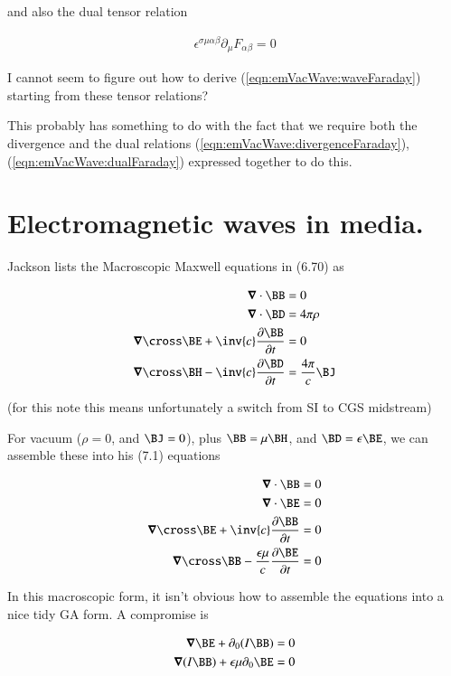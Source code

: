 and also the dual tensor relation

\begin{align}\label{eqn:emVacWave:dualFaraday}
\epsilon^{\sigma\mu\alpha\beta} \partial_\mu F_{\alpha\beta} = 0
\end{align}

I cannot seem to figure out how to derive (\ref{eqn:emVacWave:waveFaraday}) starting from these tensor relations?

This probably has something to do with the fact that we require both the divergence and the dual relations (\ref{eqn:emVacWave:divergenceFaraday}), (\ref{eqn:emVacWave:dualFaraday}) expressed together to do this.

\section{Electromagnetic waves in media.}

Jackson lists the Macroscopic Maxwell equations in (6.70) as 

\begin{align*}
\spacegrad \cdot \BB &= 0 \\
\spacegrad \cdot \BD &= 4 \pi \rho \\
\spacegrad \cross \BE + \inv{c}\PD{t}{\BB} &= 0 \\
\spacegrad \cross \BH - \inv{c}\PD{t}{\BD} &= \frac{4 \pi}{c} \BJ  \\
\end{align*}

(for this note this means unfortunately a switch from SI to CGS midstream)

For vacuum ($\rho =0$, and $\BJ =0$), plus $\BB = \mu \BH$, and $\BD = \epsilon \BE$, we can assemble these into his (7.1) equations

\begin{align*}
\spacegrad \cdot \BB &= 0 \\
\spacegrad \cdot \BE &= 0 \\
\spacegrad \cross \BE + \inv{c}\PD{t}{\BB} &= 0 \\
\spacegrad \cross \BB - \frac{\epsilon \mu}{c}\PD{t}{\BE} &= 0  \\
\end{align*}

In this macroscopic form, it isn't obvious how to assemble the equations into a nice tidy GA form.  A compromise is

\begin{align}\label{eqn:emVacWave:compromise}
\spacegrad \BE + \partial_0 (I\BB) &= 0 \\
\spacegrad (I \BB) + \epsilon \mu \partial_0 \BE &= 0 
\end{align}

